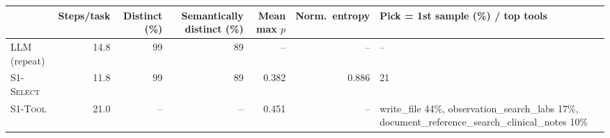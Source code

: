 \begin{tabular}{lrrrrrl}
\toprule
& Steps/task & Distinct (\%) & Semantically distinct (\%) & Mean max $p$ & Norm.\ entropy & Pick = 1st sample (\%) / top tools \\
\midrule
\textsc{LLM} (repeat) & 14.8 & 99 & 89 & -- & -- & -- \\
\textsc{S1-Select} & 11.8 & 99 & 89 & 0.382 & 0.886 & 21 \\
\textsc{S1-Tool} & 21.0 & -- & -- & 0.451 & -- & \multicolumn{1}{l}{write\_file 44\%, observation\_search\_labs 17\%, document\_reference\_search\_clinical\_notes 10\%} \\
\bottomrule
\end{tabular}
